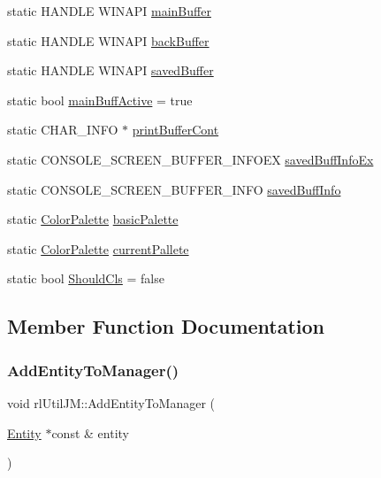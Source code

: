 \begin{DoxyCompactItemize}
\item 
static H\+A\+N\+D\+LE W\+I\+N\+A\+PI \hyperlink{classrl_util_j_m_a3682e4076d4df42fa3bc753bfce1c96b}{main\+Buffer}
\item 
static H\+A\+N\+D\+LE W\+I\+N\+A\+PI \hyperlink{classrl_util_j_m_a1460d52658dd84c331ea611137fc50f2}{back\+Buffer}
\item 
static H\+A\+N\+D\+LE W\+I\+N\+A\+PI \hyperlink{classrl_util_j_m_a3e51c90fb6965763d63edd29e57525cf}{saved\+Buffer}
\item 
static bool \hyperlink{classrl_util_j_m_a179ab751158e2eb284cc711404e89604}{main\+Buff\+Active} = true
\item 
static C\+H\+A\+R\+\_\+\+I\+N\+FO $\ast$ \hyperlink{classrl_util_j_m_a8d2728630d228078e97a21e833a9023a}{print\+Buffer\+Cont}
\item 
static C\+O\+N\+S\+O\+L\+E\+\_\+\+S\+C\+R\+E\+E\+N\+\_\+\+B\+U\+F\+F\+E\+R\+\_\+\+I\+N\+F\+O\+EX \hyperlink{classrl_util_j_m_a1791fa097dafd0a8eb7d3b85514aee4e}{saved\+Buff\+Info\+Ex}
\item 
static C\+O\+N\+S\+O\+L\+E\+\_\+\+S\+C\+R\+E\+E\+N\+\_\+\+B\+U\+F\+F\+E\+R\+\_\+\+I\+N\+FO \hyperlink{classrl_util_j_m_a462fe037cf2e8b6d87c3ba45bcb1d453}{saved\+Buff\+Info}
\item 
static \hyperlink{class_color_palette}{Color\+Palette} \hyperlink{classrl_util_j_m_a3055475de8f0221cf48d443371640108}{basic\+Palette}
\item 
static \hyperlink{class_color_palette}{Color\+Palette} \hyperlink{classrl_util_j_m_a15c920c1aa73d6853a6fd40c53ae0f0a}{current\+Pallete}
\item 
static bool \hyperlink{classrl_util_j_m_ac5e0a55c087fec67ca6b5ab54d0649c0}{Should\+Cls} = false
\end{DoxyCompactItemize}


\subsection{Member Function Documentation}
\mbox{\label{classrl_util_j_m_ae7cd27af31fab44d6bfb7f97139394e1}} 
\subsubsection{\texorpdfstring{Add\+Entity\+To\+Manager()}{AddEntityToManager()}}
{\footnotesize\ttfamily void rl\+Util\+J\+M\+::\+Add\+Entity\+To\+Manager (\begin{DoxyParamCaption}\item[{\hyperlink{class_entity}{Entity} $\ast$const \&}]{entity }\end{DoxyParamCaption})\hspace{0.3cm}{\ttfamily [static]}}


